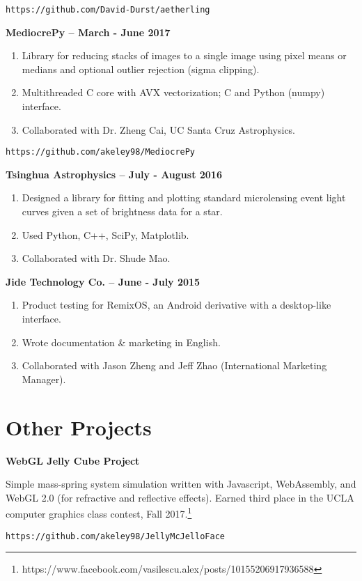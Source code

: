 \documentclass[11pt]{article}
\begin{document}
\quad\texttt{https://github.com/David-Durst/aetherling}

\textbf{MediocrePy -- March - June 2017}
\begin{enumerate}
\item Library for reducing stacks of images to a single image using pixel
means or medians and optional outlier rejection (sigma clipping).
\item Multithreaded C core with AVX vectorization; C and Python (numpy)
  interface.
\item Collaborated with Dr. Zheng Cai, UC Santa Cruz Astrophysics.
\end{enumerate}
\quad\texttt{https://github.com/akeley98/MediocrePy}

\textbf{Tsinghua Astrophysics -- July - August 2016}
\begin{enumerate}
\item Designed a library for fitting and plotting standard
  microlensing event light curves given a set of brightness
  data for a star.
\item Used Python, C++, SciPy, Matplotlib.
\item Collaborated with Dr. Shude Mao.
\end{enumerate}

\textbf{Jide Technology Co. -- June - July 2015}
\begin{enumerate}
\item Product testing for RemixOS, an Android derivative with a
  desktop-like interface.

\item Wrote documentation \& marketing in English.

\item Collaborated with Jason Zheng and Jeff Zhao (International
  Marketing Manager).
\end{enumerate}

\section{Other Projects}

\textbf{WebGL Jelly Cube Project}

Simple mass-spring system simulation written with Javascript,
WebAssembly, and WebGL 2.0 (for refractive and reflective effects).
Earned third place in the UCLA computer graphics class contest, Fall
2017.\footnote{
  https://www.facebook.com/vasilescu.alex/posts/10155206917936588}

\quad\texttt{https://github.com/akeley98/JellyMcJelloFace}
\end{document}
